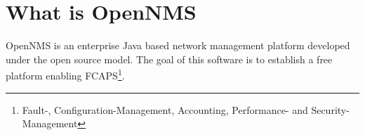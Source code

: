 \section{What is OpenNMS}
OpenNMS is an enterprise Java based network management platform developed under the open source model. The goal of this software is to establish a free platform enabling FCAPS\footnote{Fault-, Configuration-Management, Accounting, Performance- and Security-Management}.